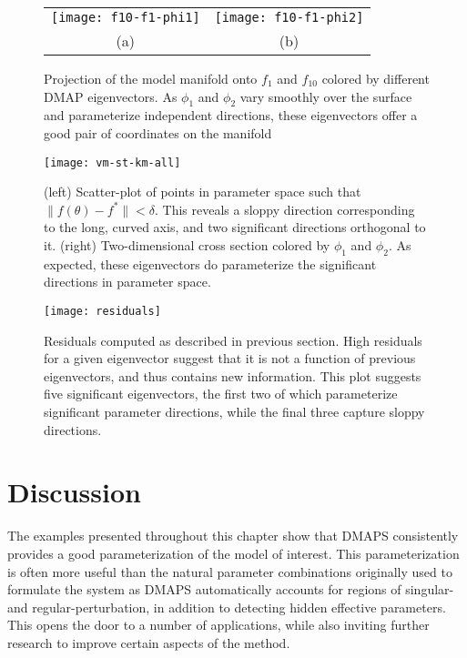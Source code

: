 \begin{figure}[!htp]
  \centering
  \begin{tabular}{cc}
    \texttt{[image: f10-f1-phi1]} &
    \texttt{[image: f10-f1-phi2]}\\
    (a) & (b) \\
  \end{tabular}
  \caption{Projection of the model manifold onto $f_1$ and $f_{10}$
    colored by different DMAP eigenvectors. As $\phi_1$ and $\phi_2$
    vary smoothly over the surface and parameterize independent
    directions, these eigenvectors offer a good pair of coordinates on
    the manifold \label{fig:mm-dmaps}}
\end{figure}


\begin{figure}[ht!]
  \centering
  \texttt{[image: vm-st-km-all]}
  \caption{(left) Scatter-plot of points in parameter space such that
    $\|f(\theta) - f^*\| < \delta$. This reveals a sloppy direction
    corresponding to the long, curved axis, and two significant
    directions orthogonal to it. (right) Two-dimensional cross section
    colored by $\phi_1$ and $\phi_2$. As expected, these eigenvectors
    do parameterize the significant directions in parameter space.
    \label{fig:mm-all} }
\end{figure}

\begin{figure}
  \centering
  \texttt{[image: residuals]}
  \caption{Residuals computed as described in previous section. High
    residuals for a given eigenvector suggest that it is not a
    function of previous eigenvectors, and thus contains new
    information. This plot suggests five significant eigenvectors, the
    first two of which parameterize significant parameter directions,
    while the final three capture sloppy
    directions. \label{fig:resids} }
\end{figure}

\section{Discussion}

The examples presented throughout this chapter show that DMAPS
consistently provides a good parameterization of the model of
interest. This parameterization is often more useful than the natural
parameter combinations originally used to formulate the system as
DMAPS automatically accounts for regions of singular- and
regular-perturbation, in addition to detecting hidden effective
parameters. This opens the door to a number of applications, while
also inviting further research to improve certain aspects of the
method.

